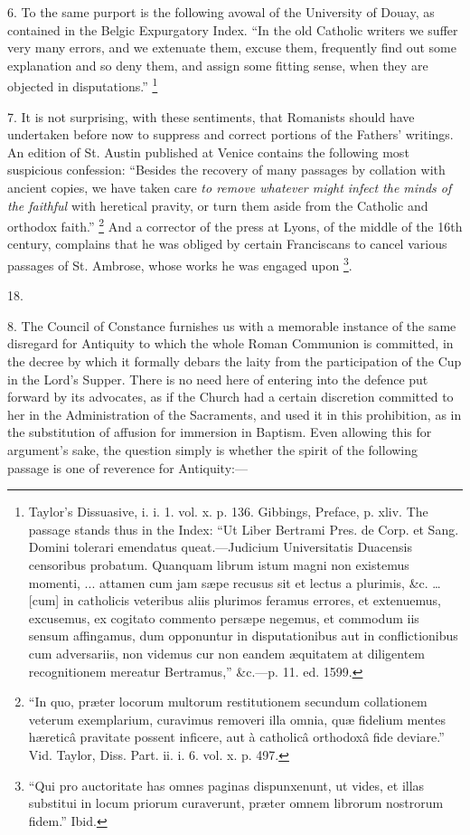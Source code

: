 6. To the same purport is the following avowal of the University of
Douay, as contained in the Belgic Expurgatory Index. ``In the old
Catholic writers we suffer very many errors, and we extenuate them,
excuse them, frequently find out some explanation and so deny them,
and assign some fitting sense, when they are objected in
disputations.'' \footnote{Taylor's Dissuasive, i. i. 1. vol. x. p.
136. Gibbings, Preface, p. xliv. The passage stands thus in the Index:
``Ut Liber Bertrami Pres. de Corp. et Sang. Domini tolerari
emendatus queat.—Judicium Universitatis Duacensis censoribus
probatum. Quanquam librum istum magni non existemus momenti, ...
attamen cum jam sæpe recusus sit et lectus a plurimis, \&c. …
[cum] in catholicis veteribus aliis plurimos feramus errores, et
extenuemus, excusemus, ex cogitato commento persæpe negemus, et
commodum iis sensum affingamus, dum opponuntur in disputationibus aut
in conflictionibus cum adversariis, non videmus cur non eandem
æquitatem at diligentem recognitionem mereatur Bertramus,''
\&c.—p. 11. ed. 1599.}

7. It is not surprising, with these sentiments, that Romanists
should have undertaken before now to suppress and correct portions of
the Fathers' writings. An edition of St. Austin published at Venice
contains the following most suspicious confession: ``Besides the
recovery of many passages by collation with ancient copies, we have
taken care \emph{to remove whatever might infect the minds of the
faithful} with heretical pravity, or turn them aside from the
Catholic and orthodox faith.'' \footnote{``In quo, præter locorum multorum
restitutionem secundum collationem veterum exemplarium, curavimus
removeri illa omnia, quæ fidelium mentes hæreticâ pravitate possent
inficere, aut à catholicâ orthodoxâ fide deviare.'' Vid.
Taylor, Diss. Part. ii. i. 6. vol. x. p. 497.} And a corrector of the press at Lyons, of the middle of the
16th century, complains that he was obliged by certain Franciscans to
cancel various passages of St. Ambrose, whose works he was engaged
upon \footnote{``Qui pro auctoritate has omnes
paginas dispunxenunt, ut vides, et illas substitui in locum priorum
curaverunt, præter omnem librorum nostrorum fidem.'' Ibid.}.

18.

8. The Council of Constance furnishes us with a memorable instance
of the same disregard for Antiquity to which the whole Roman Communion
is committed, in the decree by which it formally debars the laity from
the participation of the Cup in the Lord's Supper. There is no need
here of entering into the defence put forward by its advocates, as if
the Church had a certain discretion committed to her in the
Administration of the Sacraments, and used it in this prohibition, as
in the substitution of affusion for immersion in Baptism. Even
allowing this for argument's sake, the question simply is whether
the spirit of the following passage is one of reverence for Antiquity:—


